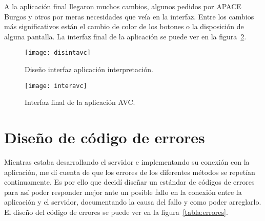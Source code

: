 A la aplicación final llegaron muchos cambios, algunos pedidos por APACE Burgos y otros por meras necesidades que veía en la interfaz. Entre los cambios más significativos están el cambio de color de los botones o la disposición de alguna pantalla. La interfaz final de la aplicación se puede ver en la figura~\ref{fig:intfin}.

\begin{figure}[htp]
	\centering
	\texttt{[image: disintavc]}
	\caption{Diseño interfaz aplicación interpretación.}
	\label{fig:diinter}
\end{figure}

\begin{figure}[H]
	\centering
	\texttt{[image: interavc]}
	\caption{Interfaz final de la aplicación AVC.}
	\label{fig:intfin}
\end{figure}

\section{Diseño de código de errores}
Mientras estaba desarrollando el servidor e implementando su conexión con la aplicación, me dí cuenta de que los errores de los diferentes métodos se repetían continuamente. Es por ello que decidí diseñar un estándar de códigos de errores para así poder responder mejor ante un posible fallo en la conexión entre la aplicación y el servidor, documentando la causa del fallo y como poder arreglarlo. El diseño del código de errores se puede ver en la figura~\ref{tabla:errores}.


